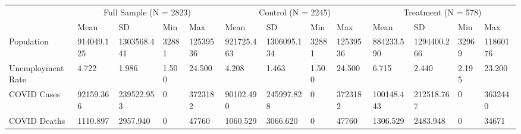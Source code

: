 \begin{tabular}{lllllllllllll}
\toprule
 & \multicolumn{4}{c}{Full Sample (N = 2823)} & \multicolumn{4}{c}{Control (N = 2245)} & \multicolumn{4}{c}{Treatment (N = 578)} \\
 & Mean & SD & Min & Max & Mean & SD & Min & Max & Mean & SD & Min & Max \\
\midrule
Population & 914049.125 & 1303568.441 & 32881 & 12539536 & 921725.463 & 1306095.134 & 32881 & 12539536 & 884233.590 & 1294400.266 & 32969 & 11860176 \\
Unemployment Rate & 4.722 & 1.986 & 1.500 & 24.500 & 4.208 & 1.463 & 1.500 & 24.500 & 6.715 & 2.440 & 2.195 & 23.200 \\
COVID Cases & 92159.366 & 239522.953 & 0 & 3723182 & 90102.490 & 245997.828 & 0 & 3723182 & 100148.443 & 212518.767 & 0 & 3632440 \\
COVID Deaths & 1110.897 & 2957.940 & 0 & 47760 & 1060.529 & 3066.620 & 0 & 47760 & 1306.529 & 2483.948 & 0 & 34671 \\
\bottomrule
\end{tabular}
